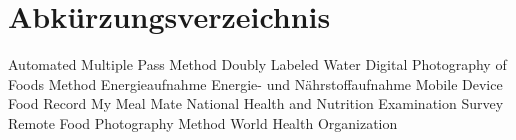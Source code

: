 \documentclass[12pt,a4paper,bibliography=totocnumbered,listof=totocnumbered]{scrartcl}
\begin{document}
\renewcommand{\cfttabpresnum}{Tab. }
\renewcommand{\cftfigpresnum}{Abb. }
\settowidth{\cfttabnumwidth}{Abb. 10\quad}
\settowidth{\cftfignumwidth}{Abb. 10\quad}

\singlespacing
{}
\renewcommand{\contentsname}{Inhaltsverzeichnis}
\tableofcontents
\pagebreak
{}
\listoffigures


\listoftables
\pagebreak


\section{Abkürzungsverzeichnis}

\begin{acronym}[LISAJERO] 

 {Automated Multiple Pass Method}
 {Doubly Labeled Water}
 {Digital Photography of Foods Method} 
 {Energieaufnahme}
 {Energie- und Nährstoffaufnahme} 
 {Mobile Device Food Record} 
 	{My Meal Mate}
 {National Health and Nutrition Examination Survey}
 {Remote Food Photography Method} 
 {World Health Organization}
\end{acronym}
\end{document}

